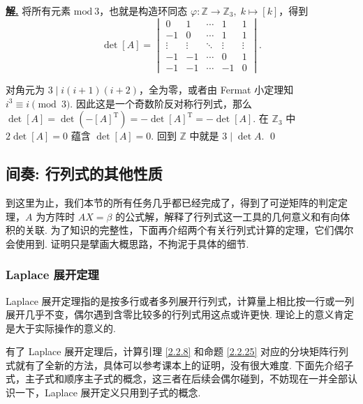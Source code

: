 \documentclass[10pt,openany]{article}
\theoremstyle{thmstyle} %
\theoremstyle{defstyle} %
\theoremstyle{prostyle} %
\theoremstyle{exastyle}
\theoremstyle{remstyle}
\newenvironment{solution}{\par\underline{\textbf{解.}} \;\fangsong}{\qed\par}
\newcommand{\T}{^{\text{T}}}
\begin{document}
\begin{solution}
	将所有元素 \( \text{mod} \ 3 \)，也就是构造环同态 \( \varphi: \mathbb{Z} \to \mathbb{Z}_3, \; k \mapsto [k] \)，得到
	\[ \det [A]=\begin{vmatrix}
		0 & 1 & \cdots & 1 & 1 \\
		-1 & 0 & \cdots & 1 & 1 \\
		\vdots & \vdots & \ddots & \vdots & \vdots \\
		-1 & -1 & \cdots & 0 & 1 \\
		-1 & -1 & \cdots & -1 & 0
	\end{vmatrix}.  \]
	
	对角元为 \( 3 \mid  i(i+1)(i+2) \)，全为零，或者由 Fermat 小定理知 \( i^3 \equiv i \pmod 3 \). 因此这是一个奇数阶反对称行列式，那么 \( \det [A]=\det (-[A]\T)= -\det [A]\T= -\det [A] \). 在 \( \mathbb{Z}_3 \) 中 \( 2\det [A]=0 \) 蕴含 \( \det [A]=0 \). 回到 \( \mathbb{Z} \) 中就是 \( 3 \mid \det A \).
\end{solution}



\subsection{间奏: 行列式的其他性质}

到这里为止，我们本节的所有任务几乎都已经完成了，得到了可逆矩阵的判定定理，\( A \) 为方阵时 \( AX=\beta \) 的公式解，解释了行列式这一工具的几何意义和有向体积的关联. 为了知识的完整性，下面再介绍两个有关行列式计算的定理，它们偶尔会使用到. 证明只是擘画大概思路，不拘泥于具体的细节.

\subsubsection{Laplace 展开定理}

Laplace 展开定理指的是按多行或者多列展开行列式，计算量上相比按一行或一列展开几乎不变，偶尔遇到含零比较多的行列式用这点或许更快. 理论上的意义肯定是大于实际操作的意义的.

有了 Laplace 展开定理后，计算引理 \ref{2.2.8} 和命题 \ref{2.2.25} 对应的分块矩阵行列式就有了全新的方法，具体可以参考课本上的证明，没有很大难度. 下面先介绍子式，主子式和顺序主子式的概念，这三者在后续会偶尔碰到，不妨现在一并全部认识一下，Laplace 展开定义只用到子式的概念. 
\end{document}
